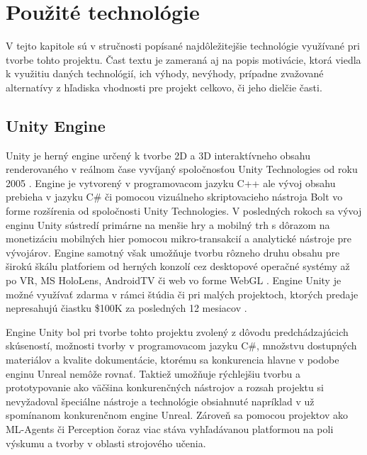 \documentclass[slovak, master]{diploma}
\begin{document}
\chapter{Použité technológie}
\label{sec:Tech}
V tejto kapitole sú v stručnosti popísané najdôležitejšie technológie využívané pri tvorbe tohto projektu. Čast textu je zameraná aj na popis motivácie, ktorá viedla k využitiu daných technológií, ich výhody, nevýhody, prípadne zvažované alternatívy z hľadiska vhodnosti pre projekt celkovo, či jeho dielčie časti.

\section{Unity Engine}
\label{sec:Unity}
Unity je herný engine určený k tvorbe 2D a 3D interaktívneho obsahu renderovaného v reálnom čase vyvíjaný spoločnosťou Unity Technologies od roku 2005 \cite{Unity}. Engine je vytvorený v programovacom jazyku C++ ale vývoj obsahu prebieha v jazyku C\# či pomocou vizuálneho skriptovacieho nástroja Bolt vo forme rozšírenia od spoločnosti Unity Technologies. V posledných rokoch sa vývoj enginu Unity sústredí primárne na menšie hry a mobilný trh s dôrazom na monetizáciu mobilných hier pomocou mikro-transakcií a analytické nástroje pre vývojárov. Engine samotný však umožňuje tvorbu rôzneho druhu obsahu pre širokú škálu platforiem od herných konzolí cez desktopové operačné systémy až po VR, MS HoloLens, AndroidTV či web vo forme WebGL \cite{UnityMultiplatform}. Engine Unity je možné využívať zdarma v rámci štúdia či pri malých projektoch, ktorých predaje nepresahujú čiastku \$100K za posledných 12 mesiacov \cite{UnityPersonal}.

Engine Unity bol pri tvorbe tohto projektu zvolený z dôvodu predchádzajúcich skúseností, možnosti tvorby v programovacom jazyku C\#, množstvu dostupných materiálov a kvalite dokumentácie, ktorému sa konkurencia hlavne v podobe enginu Unreal nemôže rovnať. Taktiež umožňuje rýchlejšiu tvorbu a prototypovanie ako väčšina konkurenčných nástrojov a rozsah projektu si nevyžadoval špeciálne nástroje a technológie obsiahnuté napríklad v už spomínanom konkurenčnom engine Unreal. Zároveň sa pomocou projektov ako ML-Agents či Perception čoraz viac stáva vyhľadávanou platformou na poli výskumu a tvorby v oblasti strojového učenia.
\end{document}
